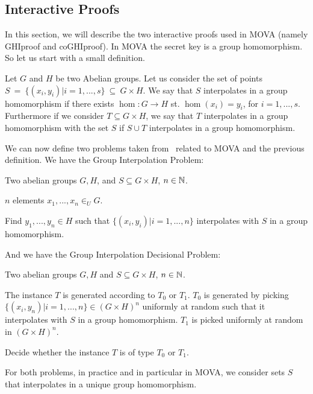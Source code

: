 \subsection{Interactive Proofs}
In this section, we will describe the two interactive proofs used in MOVA (namely GHIproof and
coGHIproof). In MOVA the secret key is a group homomorphism.
So let us start with a small definition.
\begin{definition}
    Let $G$ and $H$ be two Abelian groups. Let us consider the set of points  $S~=~\{(x_i,y_i)|i=1,...,s\}~\subseteq~G\times H
    $. We say that $S$ interpolates in a group homomorphism if there exists $\hom:G\rightarrow H$ st. 
    $\hom(x_i) = y_i$, for $i = 1,...,s$.
    Furthermore if we consider $T \subseteq G \times H$, we say that $T$ interpolates in a group homomorphism with the set $S$ if $S\cup T$ interpolates in a group homomorphism.
\end{definition}
We can now define two problems taken from~\cite{cite:generic-mova,cite:2-move} related to MOVA and the previous definition.
We have the Group Interpolation Problem:
\begin{prob_descr}
    \item[$n$-$S$-GHI Problem]
    \item[Parameters:] Two abelian groups $G,H$, and $S \subseteq G\times H$, $n\in\mathbb{N}$.
    \item[Instance Generation:] $n$ elements $x_1,...,x_n \in_U G$.
    \item[Problem:] Find $y_1,...,y_n \in H$ such that $\{(x_i,y_i)|i=1,...,n\}$ interpolates
        with $S$ in a group homomorphism.
\end{prob_descr}
And we have the Group Interpolation Decisional Problem:
\begin{prob_descr}
    \item[$n$-$S$-GHID Problem]
    \item[Parameters:] Two abelian groups $G,H$ and $S \subseteq G\times H$, $n\in\mathbb{N}$.
    \item[Instance Generation:] The instance $T$ is generated according to $T_0$ or $T_1$.
        $T_0$ is generated by picking $\{(x_i,y_n)|i=1,...,n\} \in (G\times H)^n$ uniformly at
        random such that it interpolates with $S$ in a group homomorphism. $T_1$ is picked
        uniformly at random in $(G\times H)^n$.
    \item[Problem:] Decide whether the instance $T$ is of type $T_0$ or $T_1$.
\end{prob_descr}
For both problems, in practice and in particular in MOVA, we consider sets $S$ that interpolates in a unique group homomorphism.


